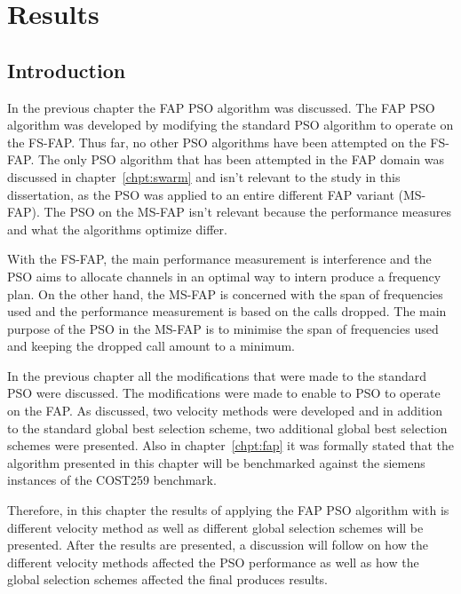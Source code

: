 \chapter{Results}
\label{chpt:results}
\section{Introduction}
In the previous chapter the FAP PSO algorithm was discussed. The FAP PSO algorithm was developed by modifying the standard PSO algorithm to operate on the FS-FAP. Thus far, no other PSO algorithms have been attempted on the FS-FAP. The only PSO algorithm that has been attempted in the FAP domain was discussed in chapter~\ref{chpt:swarm} and isn't relevant to the study in this dissertation, as the PSO was applied to an entire different FAP variant (MS-FAP). The PSO on the MS-FAP isn't relevant because the performance measures and what the algorithms optimize differ.

With the FS-FAP, the main performance measurement is interference and the PSO aims to allocate channels in an optimal way to intern produce a frequency plan. On the other hand, the MS-FAP is concerned with the span of frequencies used and the performance measurement is based on the calls dropped. The main purpose of the PSO in the MS-FAP is to minimise the span of frequencies used and keeping the dropped call amount to a minimum.

In the previous chapter all the modifications that were made to the standard PSO were discussed. The modifications were made to enable to PSO to operate on the FAP. As discussed, two velocity methods were developed and in addition to the standard global best selection scheme, two additional global best selection schemes were presented. Also in chapter~\ref{chpt:fap} it was formally stated that the algorithm presented in this chapter will be benchmarked against the siemens instances of the COST259 benchmark.

Therefore, in this chapter the results of applying the FAP PSO algorithm with is different velocity method as well as different global selection schemes will be presented. After the results are presented, a discussion will follow on how the different velocity methods affected the PSO performance as well as how the global selection schemes affected the final produces results.

